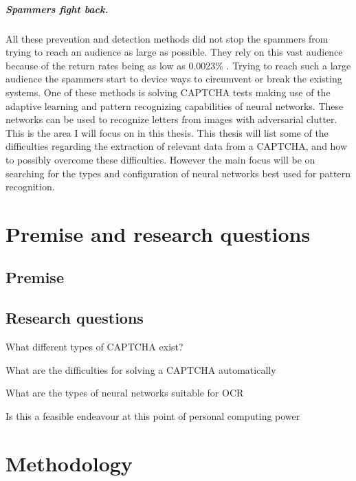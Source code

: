 \documentclass[pdftex,a4paper,12pt,twoside]{report}
\begin{document}
\paragraph{Spammers fight back.}
All these prevention and detection methods did not stop the spammers from trying to reach an audience as large  as possible. They rely on this vast audience because of the return rates being as low as 0.0023\% \citep{Cobb2003}. Trying to reach such a large audience the spammers start to device ways to circumvent or break the existing systems. One of these methods is solving CAPTCHA tests making use of the adaptive learning and pattern recognizing capabilities of neural networks. These networks can be used to recognize letters from images with adversarial clutter.
This is the area I will focus on in this thesis. This thesis will list some of the difficulties regarding the extraction of relevant data from a CAPTCHA, and how to possibly overcome these difficulties. However the main focus will be on searching for the types and configuration of neural networks best used for pattern recognition.
\chapter{Premise and research questions}
\label{ch:Premise}

\section{Premise}
\label{sec:Premise}


\section{Research questions}
\label{sec:researquestions}

What different types of CAPTCHA exist?

What are the difficulties for solving a CAPTCHA automatically

What are the types of neural networks suitable for OCR

Is this a feasible endeavour at this point of personal computing power

\chapter{Methodology}
\label{ch:methodology}
\end{document}
